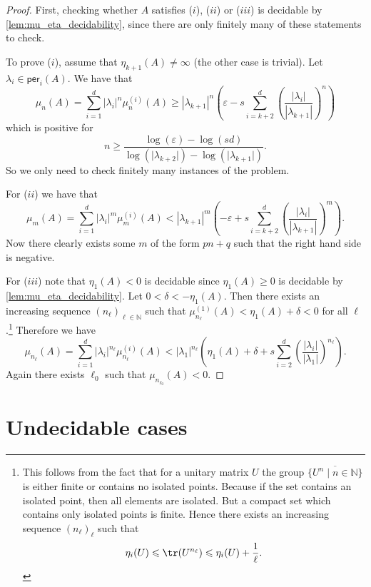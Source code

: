 \begin{proof}
First, checking whether $A$ satisfies ($i$), ($ii$) or ($iii$) is decidable by \cref{lem:mu_eta_decidability}, since there are only finitely many of these statements to check.

To prove ($i$), assume that $\eta_{k+1}(A) \neq \infty$ (the other case is trivial). Let $\lambda_i \in \mathsf{per}_i(A)$. We have that
$$\mu_n(A) = \sum_{i=1}^d |\lambda_i|^n \mu_n^{(i)}(A) \geqslant |\lambda_{k+1}|^n \left( \varepsilon - s \sum_{i=k+2}^d \left(\frac{|\lambda_{i}|}{|\lambda_{k+1}|}\right)^n \right)$$
which is positive for $$n\geqslant \frac{\log(\varepsilon)-\log(sd)}{\log(\vert\lambda_{k+2}\vert)-\log(\vert\lambda_{k+1}\vert)}.$$ So we only need to check finitely many instances of the problem.

For ($ii$) we have that
$$\mu_m(A) = \sum_{i=1}^d |\lambda_i|^m \mu_m^{(i)}(A) < |\lambda_{k+1}|^m \left( - \varepsilon + s \sum_{i=k+2}^d \left(\frac{|\lambda_{i}|}{|\lambda_{k+1}|}\right)^m \right).$$
Now there clearly exists some $m$ of the form $pn+q$ such that the right hand side is negative.


For ($iii$) note that $\eta_1(A) < 0$ is decidable since $\eta_1(A) \geqslant 0$ is decidable by \cref{lem:mu_eta_decidability}. 
Let $0 < \delta < -\eta_1(A)$. Then there exists an increasing sequence $(n_{\ell})_{\ell \in \mathbb{N}}$ such that $\mu_{n_{\ell}}^{(1)}(A) < \eta_1(A) + \delta < 0$ for all $\ell$.\footnote{This follows from the fact that for a unitary matrix $U$ the group $\overline{\{U^n\mid n \in \mathbb{N}\}}$ is either finite or contains no isolated points. Because if the set contains an isolated point, then all elements are isolated. But a compact set which contains only isolated points is finite. Hence there exists an increasing sequence $(n_\ell)_\ell$ such that $$\eta_i(U) \leqslant \tr(U^{n_\ell}) \leqslant \eta_i(U) + \frac{1}{\ell}.$$}
Therefore we have
$$\mu_{n_\ell}(A) = \sum_{i=1}^d |\lambda_i|^{n_\ell} \mu_{n_\ell}^{(i)}(A) < |\lambda_1|^{n_{\ell}} \left(\eta_1(A) + \delta +  s \sum_{i=2}^d \left(\frac{|\lambda_{i}|}{|\lambda_{1}|}\right)^{n_\ell}\right).$$
Again there exists $\ell_0$ such that $\mu_{n_{\ell_0}}(A) < 0$.
\end{proof}



\section{Undecidable cases}
\label{sec:undecidable}

